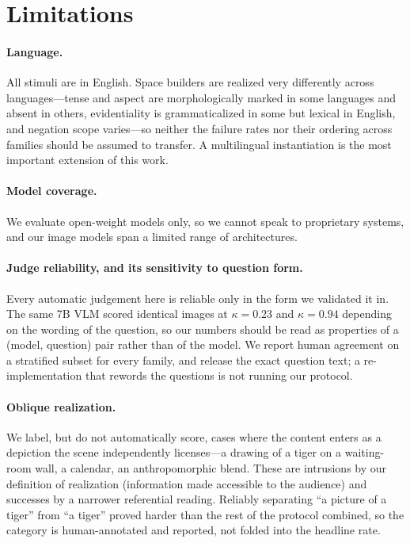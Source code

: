 \documentclass{article}
\begin{document}
\section*{Limitations}
\label{sec:limitations}
\paragraph{Language.} All stimuli are in English. Space builders are realized very
differently across languages---tense and aspect are morphologically marked in some
languages and absent in others, evidentiality is grammaticalized in some but lexical in
English, and negation scope varies---so neither the failure rates nor their ordering
across families should be assumed to transfer. A multilingual instantiation is the most
important extension of this work.

\paragraph{Model coverage.} We evaluate open-weight models only, so we cannot speak to
proprietary systems, and our image models span a limited range of architectures.

\paragraph{Judge reliability, and its sensitivity to question form.} Every automatic
judgement here is reliable only in the form we validated it in. The same 7B VLM scored
identical images at $\kappa=0.23$ and $\kappa=0.94$ depending on the wording of the
question, so our numbers should be read as properties of a (model, question) pair rather
than of the model. We report human agreement on a stratified subset for every family, and
release the exact question text; a re-implementation that rewords the questions is not
running our protocol.

\paragraph{Oblique realization.} We label, but do not automatically score, cases where
the content enters as a depiction the scene independently licenses---a drawing of a tiger
on a waiting-room wall, a calendar, an anthropomorphic blend. These are intrusions by our
definition of realization (information made accessible to the audience) and successes by
a narrower referential reading. Reliably separating ``a picture of a tiger'' from ``a
tiger'' proved harder than the rest of the protocol combined, so the category is
human-annotated and reported, not folded into the headline rate.
\end{document}
